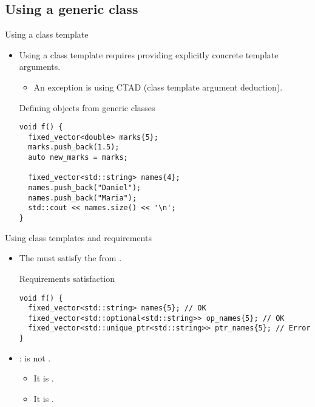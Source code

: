 \subsection{Using a generic class}

\begin{frame}[t,fragile]{Using a class template}
\begin{itemize}
  \item Using a class template requires providing explicitly concrete template arguments.
    \begin{itemize}
      \item An exception is using CTAD (class template argument deduction).
    \end{itemize}

\begin{block}{Defining objects from generic classes}
\begin{lstlisting}
void f() {
  fixed_vector<double> marks{5};
  marks.push_back(1.5);
  auto new_marks = marks;

  fixed_vector<std::string> names{4};
  names.push_back("Daniel");
  names.push_back("Maria");
  std::cout << names.size() << '\n';
}
\end{lstlisting} 
\end{block}

\end{itemize}
\end{frame}

\begin{frame}[t,fragile]{Using class templates and requirements}
\begin{itemize}
  \item The  must satisfy the 
        from .

\begin{block}{Requirements satisfaction}
\begin{lstlisting}
void f() {
  fixed_vector<std::string> names{5}; // OK
  fixed_vector<std::optional<std::string>> op_names{5}; // OK
  fixed_vector<std::unique_ptr<std::string>> ptr_names{5}; // Error
}
\end{lstlisting}
\end{block}

  \item {}:  is not .
    \begin{itemize}
      \item It is  .
      \item It is  .
    \end{itemize}

\end{itemize}
\end{frame}

